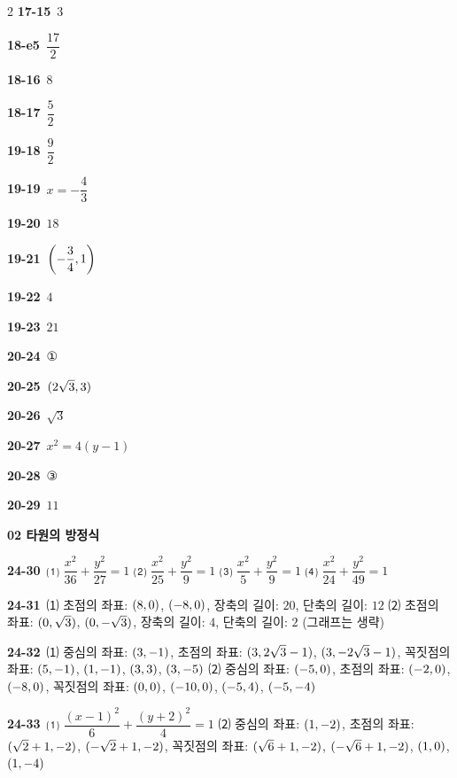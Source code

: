 \documentclass[10pt,a4paper]{article}
\begin{document}
\begin{multicols}{2}
\noindent\textbf{17-15}\ $3$\par
\noindent\textbf{18-e5}\ $\dfrac{17}{2}$\par
\noindent\textbf{18-16}\ $8$\par
\noindent\textbf{18-17}\ $\dfrac{5}{2}$\par
\noindent\textbf{19-18}\ $\dfrac{9}{2}$\par
\noindent\textbf{19-19}\ $x=-\dfrac{4}{3}$\par
\noindent\textbf{19-20}\ $18$\par
\noindent\textbf{19-21}\ $\left(-\dfrac{3}{4}{,}\mkern3mu\mathopen{}1\right)$\par
\noindent\textbf{19-22}\ $4$\par
\noindent\textbf{19-23}\ $21$\par
\noindent\textbf{20-24}\ ①\par
\noindent\textbf{20-25}\ $(2\sqrt{3}{,}\mkern3mu\mathopen{}3)$\par
\noindent\textbf{20-26}\ $\sqrt{3}$\par
\noindent\textbf{20-27}\ $x^2=4(y-1)$\par
\noindent\textbf{20-28}\ ③\par
\noindent\textbf{20-29}\ $11$\par
\noindent\textbf{02 타원의 방정식}\par\smallskip
\noindent\textbf{24-30}\ ⑴ $\dfrac{x^2}{36}+\dfrac{y^2}{27}=1$ ⑵ $\dfrac{x^2}{25}+\dfrac{y^2}{9}=1$ ⑶ $\dfrac{x^2}{5}+\dfrac{y^2}{9}=1$ ⑷ $\dfrac{x^2}{24}+\dfrac{y^2}{49}=1$\par
\noindent\textbf{24-31}\ ⑴ 초점의 좌표: $(8{,}\mkern3mu\mathopen{}0)$, $(-8{,}\mkern3mu\mathopen{}0)$, 장축의 길이: $20$, 단축의 길이: $12$ ⑵ 초점의 좌표: $(0{,}\mkern3mu\mathopen{}\sqrt{3})$, $(0{,}\mkern3mu\mathopen{}-\sqrt{3})$, 장축의 길이: $4$, 단축의 길이: $2$ (그래프는 생략)\par
\noindent\textbf{24-32}\ ⑴ 중심의 좌표: $(3{,}\mkern3mu\mathopen{}-1)$, 초점의 좌표: $(3{,}\mkern3mu\mathopen{}2\sqrt{3}-1)$, $(3{,}\mkern3mu\mathopen{}-2\sqrt{3}-1)$, 꼭짓점의 좌표: $(5{,}\mkern3mu\mathopen{}-1)$, $(1{,}\mkern3mu\mathopen{}-1)$, $(3{,}\mkern3mu\mathopen{}3)$, $(3{,}\mkern3mu\mathopen{}-5)$ ⑵ 중심의 좌표: $(-5{,}\mkern3mu\mathopen{}0)$, 초점의 좌표: $(-2{,}\mkern3mu\mathopen{}0)$, $(-8{,}\mkern3mu\mathopen{}0)$, 꼭짓점의 좌표: $(0{,}\mkern3mu\mathopen{}0)$, $(-10{,}\mkern3mu\mathopen{}0)$, $(-5{,}\mkern3mu\mathopen{}4)$, $(-5{,}\mkern3mu\mathopen{}-4)$\par
\noindent\textbf{24-33}\ ⑴ $\dfrac{(x-1)^2}{6}+\dfrac{(y+2)^2}{4}=1$ ⑵ 중심의 좌표: $(1{,}\mkern3mu\mathopen{}-2)$, 초점의 좌표: $(\sqrt{2}+1{,}\mkern3mu\mathopen{}-2)$, $(-\sqrt{2}+1{,}\mkern3mu\mathopen{}-2)$, 꼭짓점의 좌표: $(\sqrt{6}+1{,}\mkern3mu\mathopen{}-2)$, $(-\sqrt{6}+1{,}\mkern3mu\mathopen{}-2)$, $(1{,}\mkern3mu\mathopen{}0)$, $(1{,}\mkern3mu\mathopen{}-4)$\par

\end{multicols}
\end{document}
